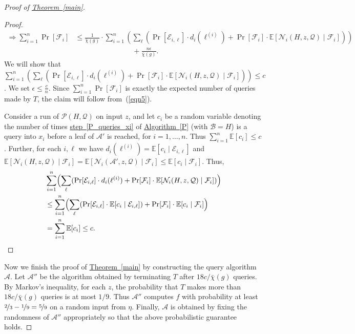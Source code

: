 \documentclass[11pt]{article}
\numberwithin{equation}{section}
\theoremstyle{definition}
\theoremstyle{plain}
\newcommand{\expref}[2]{\hyperref[#2]{#1~\ref{#2}}}
\newcommand{\dr}{\nicefrac}
\newcommand{\cA}{\mathcal{A}}
\newcommand{\clB}{\mathcal{B}}
\newcommand{\clE}{\mathcal{E}}
\newcommand{\clQ}{\mathcal{Q}}
\newcommand{\clP}{\mathcal{P}}
\newcommand{\clN}{\mathcal{N}}
\newcommand{\E}{\mathbb{E}}
\begin{document}
\begin{proof}[Proof of {\expref{Theorem}{main}}]
\begin{proof}
\begin{align}
\Rightarrow \sum_{i=1}^n \Pr[\mathcal{F}_i] &\leq  \frac{1}{\bar \chi(g)} \cdot \sum_{i=1}^n\left(\sum_{\ell}(\Pr[\clE_{i,\ell}]\cdot d_i(\ell^{(i)})+\Pr[\mathcal{F}_i]\cdot \E[\clN_i(H,z,\clQ) \mid \mathcal{F}_i])\right)\nonumber\\
&\qquad \qquad \qquad \qquad+\frac{n\epsilon}{\bar\chi(g)}.
\label{eqn5}
\end{align}
We will show that $\sum_{i=1}^n\left(\sum_{\ell}(\Pr[\clE_{i,\ell}]\cdot d_i(\ell^{(i)})+\Pr[\mathcal{F}_i]\cdot \E[\clN_i(H,z,\clQ) \mid \mathcal{F}_i])\right) \leq c$. We set $\epsilon \leq \frac{c}{n}$. Since $\sum_{i=1}^n \Pr[\mathcal{F}_i]$ is exactly the expected number of queries made by $T$, the claim will follow from~(\ref{eqn5}). 

Consider a run of $\clP(H,\clQ)$ on input $z$, and let $c_i$ be a random variable denoting the number of times \expref{step}{P_queries_xi} of \expref{Algorithm}{P} (with $\clB = H$) is a query into $x_i$ before a leaf of $\cA'$ is reached, for $i=1, \ldots, n$.  
Thus $\sum_{i=1}^n \E[c_i] \leq c$.
Further, for each $i,\ell$ we have $d_i(\ell^{(i)}) = \E[c_i \mid \clE_{i,\ell}]$ and $\E[\clN_i(H,z,\clQ) \mid \mathcal{F}_i] =\E[\clN_i(\cA',z,\clQ) \mid \mathcal{F}_i] \leq \E[c_i \mid \mathcal{F}_i]$. Thus,
\begin{align*}
&\sum_{i=1}^n\Bigl(\sum_{\ell}(\Pr[\clE_{i,\ell}]\cdot d_i(\ell^{(i)})+\Pr[\mathcal{F}_i]\cdot \E[\clN_i(H,z,\clQ) \mid \mathcal{F}_i])\Bigr) \\
&\leq \sum_{i=1}^n \Bigl(\sum_{\ell}(\Pr[\clE_{i,\ell}] \cdot \E[c_i \mid \clE_{i,\ell}]) +\Pr[\mathcal{F}_i]\cdot\E[c_i \mid \mathcal{F}_i]\Bigr) \\
&= \sum_{i=1}^n \E[c_i ] \leq c.
\end{align*}
\end{proof}

Now we finish the proof of \expref{Theorem}{main} by constructing the query algorithm $\cA$. Let $\cA''$ be the algorithm obtained by terminating $T$ after $18c/\bar\chi(g)$ queries. By Markov's inequality, for each $z$, the probability that $T$ makes more than $18c/\bar\chi(g)$ queries is at most $1/9$. Thus $\cA''$ computes $f$ with probability at least $\dr23 - \dr19=\dr59$ on a random input from $\eta$. Finally, $\cA$ is obtained by fixing the randomness of $\cA''$ appropriately so that the above probabilistic guarantee holds.
\end{proof}
%
\end{document}
